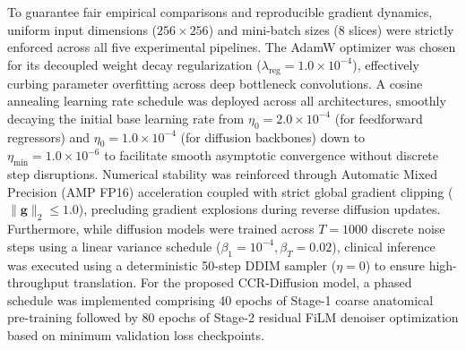 To guarantee fair empirical comparisons and reproducible gradient dynamics, uniform input dimensions ($256 \times 256$) and mini-batch sizes ($8$ slices) were strictly enforced across all five experimental pipelines. The AdamW optimizer was chosen for its decoupled weight decay regularization ($\lambda_{\text{reg}} = 1.0 \times 10^{-4}$), effectively curbing parameter overfitting across deep bottleneck convolutions. A cosine annealing learning rate schedule was deployed across all architectures, smoothly decaying the initial base learning rate from $\eta_0 = 2.0 \times 10^{-4}$ (for feedforward regressors) and $\eta_0 = 1.0 \times 10^{-4}$ (for diffusion backbones) down to $\eta_{\min} = 1.0 \times 10^{-6}$ to facilitate smooth asymptotic convergence without discrete step disruptions. Numerical stability was reinforced through Automatic Mixed Precision (AMP FP16) acceleration coupled with strict global gradient clipping ($\|\mathbf{g}\|_2 \le 1.0$), precluding gradient explosions during reverse diffusion updates. Furthermore, while diffusion models were trained across $T = 1000$ discrete noise steps using a linear variance schedule ($\beta_1 = 10^{-4}, \beta_T = 0.02$), clinical inference was executed using a deterministic 50-step DDIM sampler ($\eta = 0$) to ensure high-throughput translation. For the proposed CCR-Diffusion model, a phased schedule was implemented comprising 40 epochs of Stage-1 coarse anatomical pre-training followed by 80 epochs of Stage-2 residual FiLM denoiser optimization based on minimum validation loss checkpoints.

